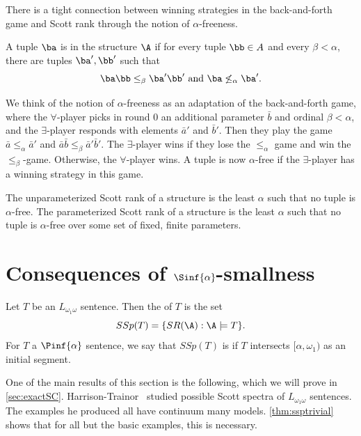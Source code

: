 \documentclass{amsart}
\renewcommand{\-}{\text{-}}
\begin{document}
There is a tight connection between winning strategies in the back-and-forth game and Scott rank through the notion of $\alpha$-freeness.

\begin{definition}
A tuple $\ba$ is  in the structure $\A$ if for every tuple $\bb\in A$ and every $\beta<\alpha$, there are tuples $\ba',\bb'$ such that 
\[\ba\bb\leq_\beta\ba'\bb' \text{ and } \ba\not\leq_\alpha\ba'.\]
\end{definition}

We think of the notion of $\alpha$-freeness as an adaptation of the back-and-forth game, where the $\forall$-player picks in round $0$ an additional parameter $\bar b$ and ordinal $\beta<\alpha$, and the $\exists$-player responds with elements $\bar a'$ and $\bar b'$. Then they play the game $\bar a\leq_\alpha \bar a'$ and $\bar a \bar b\leq_\beta \bar a'\bar b'$. The $\exists$-player wins if they lose the $\leq_\alpha$ game and win the $\leq_\beta$-game. Otherwise, the $\forall$-player wins. A tuple is now $\alpha$-free if the $\exists$-player has a winning strategy in this game.
\begin{theorem}
The unparameterized Scott rank of a structure is the least $\alpha$ such that no tuple is $\alpha$-free.
The parameterized Scott rank of a structure is the least $\alpha$ such that no tuple is $\alpha$-free over some set of fixed, finite parameters.
\end{theorem}


 

\section{Consequences of $\Sinf{\alpha}$-smallness}

\begin{definition}\label{def:scottspectrum}
	Let $T$ be an $L_{\omega_1\omega}$ sentence. Then the  of $T$ is the set
	\[ SSp(T)=\{ SR(\A): \A\models T\}.\]
	For $T$ a $\Pinf{\alpha}$ sentence, we say that $SSp(T)$ is  if $T$ intersects $[\alpha,\omega_1)$ as an initial segment.
\end{definition}
One of the main results of this section is the following, which we will prove in \cref{sec:exactSC}.
\ssptrivial
Harrison-Trainor~\cite{HT18} studied possible Scott spectra of $L_{\omega_1\omega}$ sentences. The examples he produced all have continuum many models. \cref{thm:ssptrivial} shows that for all but the basic examples, this is necessary.
\end{document}
